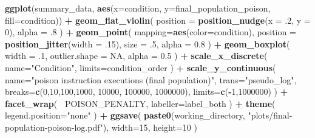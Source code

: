 \documentclass[]{book}
\newenvironment{Shaded}{\begin{snugshade}}{\end{snugshade}}
\newcommand{\DataTypeTok}[1]{\textcolor[rgb]{0.13,0.29,0.53}{#1}}
\newcommand{\DecValTok}[1]{\textcolor[rgb]{0.00,0.00,0.81}{#1}}
\newcommand{\FloatTok}[1]{\textcolor[rgb]{0.00,0.00,0.81}{#1}}
\newcommand{\KeywordTok}[1]{\textcolor[rgb]{0.13,0.29,0.53}{\textbf{#1}}}
\newcommand{\NormalTok}[1]{#1}
\newcommand{\OperatorTok}[1]{\textcolor[rgb]{0.81,0.36,0.00}{\textbf{#1}}}
\newcommand{\OtherTok}[1]{\textcolor[rgb]{0.56,0.35,0.01}{#1}}
\newcommand{\StringTok}[1]{\textcolor[rgb]{0.31,0.60,0.02}{#1}}
\begin{document}
\begin{Shaded}
\begin{Highlighting}[]
\KeywordTok{ggplot}\NormalTok{(summary_data, }\KeywordTok{aes}\NormalTok{(}\DataTypeTok{x=}\NormalTok{condition, }\DataTypeTok{y=}\NormalTok{final_population_poison, }\DataTypeTok{fill=}\NormalTok{condition)) }\OperatorTok{+}
\StringTok{  }\KeywordTok{geom_flat_violin}\NormalTok{(}
    \DataTypeTok{position =} \KeywordTok{position_nudge}\NormalTok{(}\DataTypeTok{x =} \FloatTok{.2}\NormalTok{, }\DataTypeTok{y =} \DecValTok{0}\NormalTok{),}
    \DataTypeTok{alpha =} \FloatTok{.8}
\NormalTok{  ) }\OperatorTok{+}
\StringTok{  }\KeywordTok{geom_point}\NormalTok{(}
    \DataTypeTok{mapping=}\KeywordTok{aes}\NormalTok{(}\DataTypeTok{color=}\NormalTok{condition),}
    \DataTypeTok{position =} \KeywordTok{position_jitter}\NormalTok{(}\DataTypeTok{width =} \FloatTok{.15}\NormalTok{),}
    \DataTypeTok{size =} \FloatTok{.5}\NormalTok{,}
    \DataTypeTok{alpha =} \FloatTok{0.8}
\NormalTok{  ) }\OperatorTok{+}
\StringTok{  }\KeywordTok{geom_boxplot}\NormalTok{(}
    \DataTypeTok{width =} \FloatTok{.1}\NormalTok{,}
    \DataTypeTok{outlier.shape =} \OtherTok{NA}\NormalTok{,}
    \DataTypeTok{alpha =} \FloatTok{0.5}
\NormalTok{  ) }\OperatorTok{+}
\StringTok{  }\KeywordTok{scale_x_discrete}\NormalTok{(}
    \DataTypeTok{name=}\StringTok{"Condition"}\NormalTok{,}
    \DataTypeTok{limits=}\NormalTok{condition_order}
\NormalTok{  ) }\OperatorTok{+}
\StringTok{  }\KeywordTok{scale_y_continuous}\NormalTok{(}
    \DataTypeTok{name=}\StringTok{"poison instruction executions (final population)"}\NormalTok{,}
    \DataTypeTok{trans=}\StringTok{"pseudo_log"}\NormalTok{,}
    \DataTypeTok{breaks=}\KeywordTok{c}\NormalTok{(}\DecValTok{0}\NormalTok{,}\DecValTok{10}\NormalTok{,}\DecValTok{100}\NormalTok{,}\DecValTok{1000}\NormalTok{, }\DecValTok{10000}\NormalTok{, }\DecValTok{100000}\NormalTok{, }\DecValTok{1000000}\NormalTok{),}
    \DataTypeTok{limits=}\KeywordTok{c}\NormalTok{(}\OperatorTok{-}\DecValTok{1}\NormalTok{,}\DecValTok{1000000}\NormalTok{)}
\NormalTok{  ) }\OperatorTok{+}
\StringTok{  }\KeywordTok{facet_wrap}\NormalTok{(}
    \OperatorTok{~}\NormalTok{POISON_PENALTY,}
    \DataTypeTok{labeller=}\NormalTok{label_both}
\NormalTok{  ) }\OperatorTok{+}
\StringTok{  }\KeywordTok{theme}\NormalTok{(}
    \DataTypeTok{legend.position=}\StringTok{"none"}
\NormalTok{  ) }\OperatorTok{+}
\StringTok{  }\KeywordTok{ggsave}\NormalTok{(}
    \KeywordTok{paste0}\NormalTok{(working_directory, }\StringTok{"plots/final-population-poison-log.pdf"}\NormalTok{),}
    \DataTypeTok{width=}\DecValTok{15}\NormalTok{,}
    \DataTypeTok{height=}\DecValTok{10}
\NormalTok{  )}
\end{Highlighting}
\end{Shaded}
\end{document}
